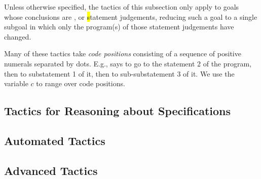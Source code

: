 Unless otherwise specified, the tactics of this subsection only apply
to goals whose conclusions are \prhl, \phl or \hl statement
judgements, reducing such a goal to a single subgoal in which only the
program(s) of those statement judgements have changed.

Many of these tactics take \emph{code positions} consisting of a
sequence of positive numerals separated by dots.  E.g., 
says to go to the statement 2 of the program, then to substatement 1
of it, then to sub-substatement 3 of it. We use the variable $c$ to
range over code positions.















\subsection{Tactics for Reasoning about Specifications}














\subsection{Automated Tactics}
\label{subsec:automatedtactics}




\subsection{Advanced Tactics}
\label{subsec:advancedtactics}



